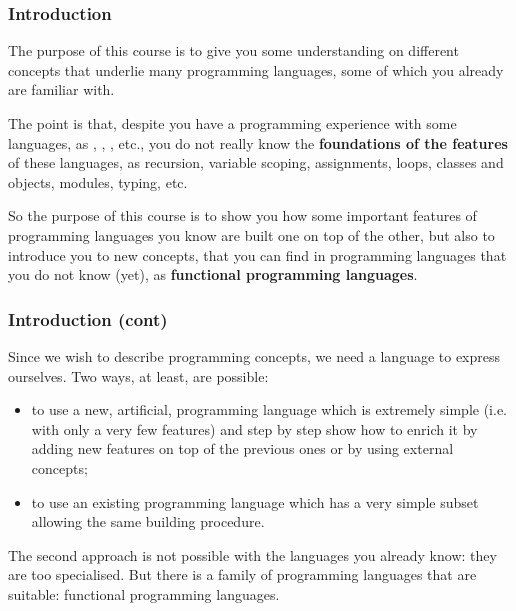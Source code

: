 
%
\begin{frame}
\frametitle{Introduction}

The purpose of this course is to give you some understanding on
different concepts that underlie many programming languages, some of
which you already are familiar with.

\bigskip

The point is that, despite you have a programming experience with some
languages, as \Java, \C, \Cpp, \Csharp etc., you do not really know
the \textbf{foundations of the features} of these languages, as
recursion, variable scoping, assignments, loops, classes and objects,
modules, typing, etc.

\bigskip

So the purpose of this course is to show you how some important
features of programming languages you know are built one on top of the
other, but also to introduce you to new concepts, that you can find in
programming languages that you do not know (yet), as
\textbf{functional programming languages}.

\end{frame}

%
\begin{frame}
\frametitle{Introduction (cont)}

Since we wish to describe programming concepts, we need a language to
express ourselves. Two ways, at least, are possible:
\begin{itemize}

  \item to use a new, artificial, programming language which is
    extremely simple (i.e. with only a very few features) and step by
    step show how to enrich it by adding new features on top of the
    previous ones or by using external concepts;

  \item to use an existing programming language which has a very
    simple subset allowing the same building procedure.

\end{itemize}
The second approach is not possible with the languages you already
know: they are too specialised. But there is a family of programming
languages that are suitable: functional programming languages.

\end{frame}
